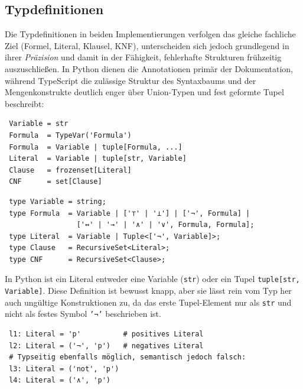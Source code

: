 \subsection{Typdefinitionen}
Die Typdefinitionen in beiden Implementierungen verfolgen das gleiche fachliche Ziel (Formel, Literal, Klausel, \ac{KNF}), unterscheiden sich jedoch grundlegend in ihrer \textit{Präzision} und damit in der Fähigkeit, fehlerhafte Strukturen frühzeitig auszuschließen. In Python dienen die Annotationen primär der Dokumentation, während TypeScript die zulässige Struktur des Syntaxbaums und der Mengenkonstrukte deutlich enger über Union-Typen und fest geformte Tupel beschreibt:

\begin{verbatim}
 Variable = str
 Formula  = TypeVar('Formula')
 Formula  = Variable | tuple[Formula, ...]
 Literal  = Variable | tuple[str, Variable]
 Clause   = frozenset[Literal]
 CNF      = set[Clause]
\end{verbatim}

\begin{verbatim}
 type Variable = string;
 type Formula  = Variable | ['⊤' | '⊥'] | ['¬', Formula] | 
                 ['↔' | '→' | '∧' | '∨', Formula, Formula];
 type Literal  = Variable | Tuple<['¬', Variable]>;
 type Clause   = RecursiveSet<Literal>;
 type CNF      = RecursiveSet<Clause>;
\end{verbatim}


In Python ist ein Literal entweder eine Variable (\texttt{str}) oder ein Tupel \texttt{tuple[str, Variable]}. Diese Definition ist bewusst knapp, aber sie lässt rein vom Typ her auch ungültige Konstruktionen zu, da das erste Tupel-Element nur als \texttt{str} und nicht als festes Symbol \texttt{'¬'} beschrieben ist.

\begin{verbatim}
 l1: Literal = 'p'          # positives Literal
 l2: Literal = ('¬', 'p')   # negatives Literal
 # Typseitig ebenfalls möglich, semantisch jedoch falsch:
 l3: Literal = ('not', 'p')
 l4: Literal = ('∧', 'p')
\end{verbatim}

